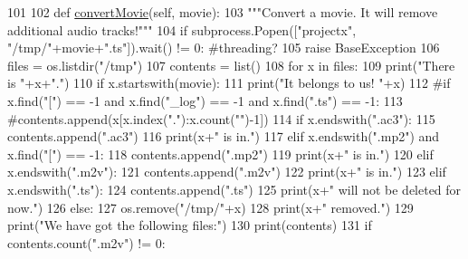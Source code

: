 \begin{DoxyCode}
101 
102     \textcolor{keyword}{def }\hyperlink{classmovies2hdd_1_1_movies2_h_d_d_afafc16b9fc0e83485db9b47d7ba7e386}{convertMovie}(self, movie):
103         \textcolor{stringliteral}{"""Convert a movie. It will remove additional audio tracks!"""}
104         \textcolor{keywordflow}{if} subprocess.Popen([\textcolor{stringliteral}{"projectx"}, \textcolor{stringliteral}{"/tmp/"}+movie+\textcolor{stringliteral}{".ts"}]).wait() != 0: \textcolor{comment}{#threading?}
105             \textcolor{keywordflow}{raise} BaseException
106         files = os.listdir(\textcolor{stringliteral}{"/tmp"})
107         contents = list()
108         \textcolor{keywordflow}{for} x \textcolor{keywordflow}{in} files:
109             print(\textcolor{stringliteral}{"There is "}+x+\textcolor{stringliteral}{"."})
110             \textcolor{keywordflow}{if} x.startswith(movie):
111                 print(\textcolor{stringliteral}{"It belongs to us! "}+x)
112                 \textcolor{comment}{#if x.find("[") == -1 and x.find("\_log") == -1 and x.find(".ts") == -1:}
113                     \textcolor{comment}{#contents.append(x[x.index("."):x.count("")-1])}
114                 \textcolor{keywordflow}{if} x.endswith(\textcolor{stringliteral}{".ac3"}):
115                     contents.append(\textcolor{stringliteral}{".ac3"})
116                     print(x+\textcolor{stringliteral}{" is in."})
117                 \textcolor{keywordflow}{elif} x.endswith(\textcolor{stringliteral}{".mp2"}) \textcolor{keywordflow}{and} x.find(\textcolor{stringliteral}{"["}) == -1:
118                     contents.append(\textcolor{stringliteral}{".mp2"})
119                     print(x+\textcolor{stringliteral}{" is in."})
120                 \textcolor{keywordflow}{elif} x.endswith(\textcolor{stringliteral}{".m2v"}):
121                     contents.append(\textcolor{stringliteral}{".m2v"})
122                     print(x+\textcolor{stringliteral}{" is in."})
123                 \textcolor{keywordflow}{elif} x.endswith(\textcolor{stringliteral}{".ts"}):
124                     contents.append(\textcolor{stringliteral}{".ts"})
125                     print(x+\textcolor{stringliteral}{" will not be deleted for now."})
126                 \textcolor{keywordflow}{else}:
127                     os.remove(\textcolor{stringliteral}{"/tmp/"}+x)
128                     print(x+\textcolor{stringliteral}{" removed."})
129         print(\textcolor{stringliteral}{"We have got the following files:"})
130         print(contents)
131         \textcolor{keywordflow}{if} contents.count(\textcolor{stringliteral}{".m2v"}) != 0:

\end{DoxyCode}
